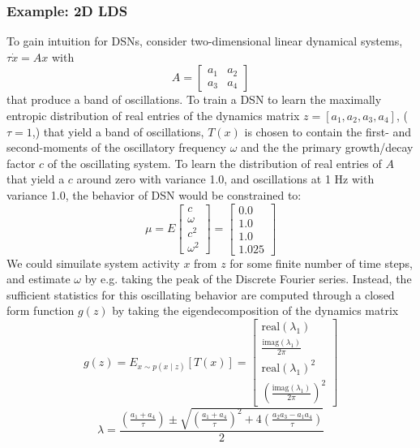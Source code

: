 \documentclass[11pt]{article}
\begin{document}
\subsubsection{Example: 2D LDS}
To gain intuition for DSNs, consider two-dimensional linear dynamical systems, $\tau \dot{x} = Ax$ with 
\[A = \begin{bmatrix} a_1 & a_2 \\ a_3 & a_4 \end{bmatrix}\]
 that produce a band of oscillations. To train a DSN to learn the maximally entropic distribution of real entries of the dynamics matrix $z = \left[a_1, a_2, a_3, a_4 \right]$, ($\tau=1$,) that yield a band of oscillations, $T(x)$ is chosen to contain the first- and second-moments of the oscillatory frequency $\omega$ and the the primary growth/decay factor $c$ of the oscillating system.  To learn the distribution of real entries of $A$ that yield a $c$ around zero with variance 1.0, and oscillations at 1 Hz with variance 1.0, the behavior of DSN would be constrained to:
\begin{equation}
 \mu = E \begin{bmatrix} c \\ \omega \\ c^2 \\ \omega^2 \end{bmatrix} = \begin{bmatrix} 0.0 \\ 1.0 \\ 1.0 \\ 1.025 \end{bmatrix}
 \end{equation} 
We could simuilate system activity $x$ from $z$ for some finite number of time steps, and estimate $\omega$ by e.g. taking the peak of the Discrete Fourier series.  Instead, the sufficient statistics for this oscillating behavior are computed through a closed form function $g(z)$ by taking the eigendecomposition of the dynamics matrix
\begin{equation}
g(z) = E_{x\sim p(x \mid z)}\left[T(x)\right] =  \begin{bmatrix} \text{real}(\lambda_1) \\ \frac{\text{imag}(\lambda_1)}{2 \pi} \\ \text{real}(\lambda_1)^2 \\ (\frac{\text{imag}(\lambda_1)}{2 \pi})^2 \end{bmatrix}
\end{equation}
\begin{equation}
\lambda = \frac{(\frac{a_1 + a_4}{\tau}) \pm \sqrt{(\frac{a_1+a_4}{\tau})^2 + 4(\frac{a_2 a_3 - a_1 a_4}{\tau})}}{2}
\end{equation}
\end{document}
